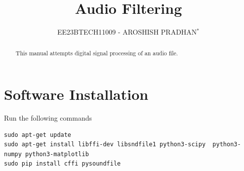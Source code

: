 \documentclass[journal,12pt,twocolumn]{IEEEtran}
\theoremstyle{remark}
\numberwithin{equation}{subsection}
\begin{document}
\renewcommand{\thefigure}{\theproblem.\arabic{figure}}
\renewcommand{\thefigure}{\theproblem}




\vspace{3cm}

\title{Audio Filtering}

\author{EE23BTECH11009 - AROSHISH PRADHAN$^{*}$}

\maketitle

\tableofcontents

\renewcommand{\thefigure}{\theenumi}
\renewcommand{\thetable}{\theenumi}
\bigskip

\begin{abstract}
This manual attempts digital signal processing of an audio file.
\end{abstract}

\section{Software Installation}
Run the following commands
\begin{lstlisting}
sudo apt-get update
sudo apt-get install libffi-dev libsndfile1 python3-scipy  python3-numpy python3-matplotlib 
sudo pip install cffi pysoundfile 
\end{lstlisting}
\end{document}
